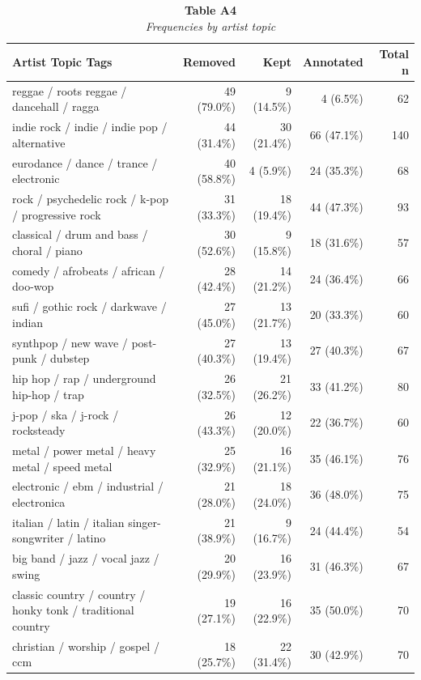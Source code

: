 \documentclass[
  man]{apa7}
\begin{document}
\begin{table}
\caption*{
{\large \textbf{Table A4}} \\ 
{\small \emph{Frequencies by artist topic}}
} 
\fontsize{12.0pt}{14.4pt}\selectfont
\begin{tabular*}{\linewidth}{@{\extracolsep{\fill}}lrrrr}
\toprule
{Artist Topic Tags} & Removed & Kept & Annotated & Total n \\ 
\midrule\addlinespace[2.5pt]
reggae / roots reggae / dancehall / ragga & 49 (79.0\%) & 9 (14.5\%) & 4 (6.5\%) & 62 \\ 
indie rock / indie / indie pop / alternative & 44 (31.4\%) & 30 (21.4\%) & 66 (47.1\%) & 140 \\ 
eurodance / dance / trance / electronic & 40 (58.8\%) & 4 (5.9\%) & 24 (35.3\%) & 68 \\ 
rock / psychedelic rock / k-pop / progressive rock & 31 (33.3\%) & 18 (19.4\%) & 44 (47.3\%) & 93 \\ 
classical / drum and bass / choral / piano & 30 (52.6\%) & 9 (15.8\%) & 18 (31.6\%) & 57 \\ 
comedy / afrobeats / african / doo-wop & 28 (42.4\%) & 14 (21.2\%) & 24 (36.4\%) & 66 \\ 
sufi / gothic rock / darkwave / indian & 27 (45.0\%) & 13 (21.7\%) & 20 (33.3\%) & 60 \\ 
synthpop / new wave / post-punk / dubstep & 27 (40.3\%) & 13 (19.4\%) & 27 (40.3\%) & 67 \\ 
hip hop / rap / underground hip-hop / trap & 26 (32.5\%) & 21 (26.2\%) & 33 (41.2\%) & 80 \\ 
j-pop / ska / j-rock / rocksteady & 26 (43.3\%) & 12 (20.0\%) & 22 (36.7\%) & 60 \\ 
metal / power metal / heavy metal / speed metal & 25 (32.9\%) & 16 (21.1\%) & 35 (46.1\%) & 76 \\ 
electronic / ebm / industrial / electronica & 21 (28.0\%) & 18 (24.0\%) & 36 (48.0\%) & 75 \\ 
italian / latin / italian singer-songwriter / latino & 21 (38.9\%) & 9 (16.7\%) & 24 (44.4\%) & 54 \\ 
big band / jazz / vocal jazz / swing & 20 (29.9\%) & 16 (23.9\%) & 31 (46.3\%) & 67 \\ 
classic country / country / honky tonk / traditional country & 19 (27.1\%) & 16 (22.9\%) & 35 (50.0\%) & 70 \\ 
christian / worship / gospel / ccm & 18 (25.7\%) & 22 (31.4\%) & 30 (42.9\%) & 70 \\ 

\end{tabular*}
\end{table}
\end{document}
